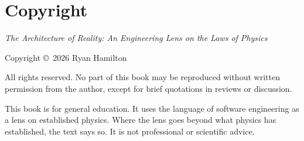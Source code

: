 \chapter*{Copyright}

\noindent \textit{The Architecture of Reality: An Engineering Lens on the Laws of Physics}

\medskip
\noindent Copyright \copyright\ 2026 Ryan Hamilton

\medskip
\noindent All rights reserved. No part of this book may be reproduced without written permission from the author, except for brief quotations in reviews or discussion.

\medskip
\noindent This book is for general education. It uses the language of software engineering as a lens on established physics. Where the lens goes beyond what physics has established, the text says so. It is not professional or scientific advice.

